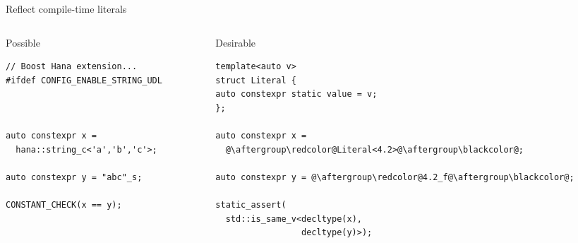 \documentclass[xcolor=dvipsnames]{beamer}
\begin{document}
\begin{frame}[fragile]{Reflect compile-time literals}
  \begin{columns}[T] %
    \begin{column}{0.52\textwidth}
\begin{center}Possible\end{center}
  \begin{lstlisting}
// Boost Hana extension...
#ifdef CONFIG_ENABLE_STRING_UDL



auto constexpr x =
  hana::string_c<'a','b','c'>;

auto constexpr y = "abc"_s;

CONSTANT_CHECK(x == y);
  \end{lstlisting}
    \end{column}%
    \hfill%
    \begin{column}{0.55\textwidth}
\begin{center}Desirable\end{center}
      \begin{lstlisting}
template<auto v>
struct Literal {
auto constexpr static value = v;
};

auto constexpr x =
  @\aftergroup\redcolor@Literal<4.2>@\aftergroup\blackcolor@;

auto constexpr y = @\aftergroup\redcolor@4.2_f@\aftergroup\blackcolor@;

static_assert(
  std::is_same_v<decltype(x),
                 decltype(y)>);
 \end{lstlisting}
    \end{column}%
  \end{columns}
\end{frame}
\end{document}

